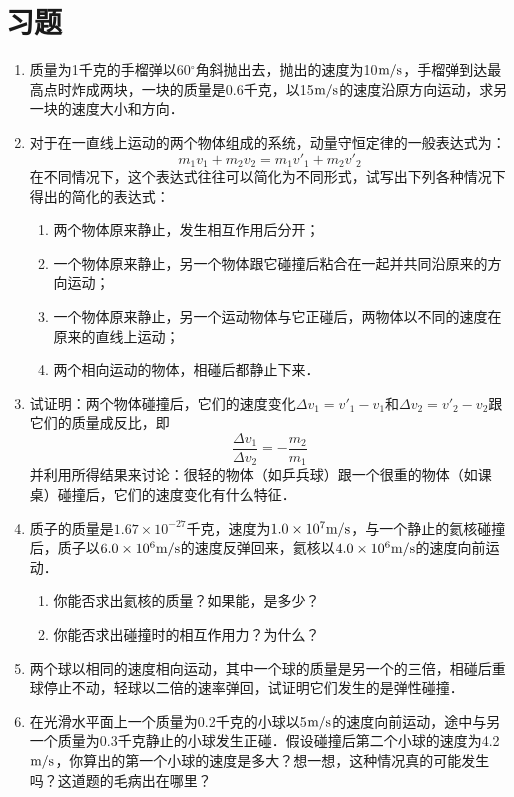 \section*{习题}
\begin{enumerate}
    \item 质量为1千克的手榴弹以60$^\circ$角斜抛出去，抛出的速度为10$\text{m}/\text{s}$，手榴弹到达最高点时炸成两块，一块的质量是0.6千克，以15$\text{m}/\text{s}$的速度沿原方向运动，求另一块的速度大小和方向．
    \item 对于在一直线上运动的两个物体组成的系统，动量守恒定律的一般表达式为：
\[m_1v_1+m_2v_2=m_1v'_1+m_2v'_2 \]
    在不同情况下，这个表达式往往可以简化为不同形式，试写出下列各种情况下得出的简化的表达式：
\begin{enumerate}
    \item 两个物体原来静止，发生相互作用后分开；
    \item 一个物体原来静止，另一个物体跟它碰撞后粘合在一起并共同沿原来的方向运动；
    \item 一个物体原来静止，另一个运动物体与它正碰后，两物体以不同的速度在原来的直线上运动；
    \item 两个相向运动的物体，相碰后都静止下来．
\end{enumerate}
\item 试证明：两个物体碰撞后，它们的速度变化$\Delta v_1=v'_1-v_1$和$\Delta v_2=v'_2-v_2$跟它们的质量成反比，即
\[\frac{\Delta v_1}{\Delta v_2}=-\frac{m_2}{m_1}\]
并利用所得结果来讨论：很轻的物体（如乒兵球）跟一个很重的物体（如课桌）碰撞后，它们的速度变化有什么特征．
\item 质子的质量是$1.67\times 10^{-27}$千克，速度为$1.0\times 10^7\text{m}/\text{s}$，与一个静止的氦核碰撞后，质子以$6.0\times 10^6\text{m}/\text{s}$的速度反弹回来，氦核以$4.0\times 10^6\text{m}/\text{s}$的速度向前运动．
   \begin{enumerate}
       \item 你能否求出氦核的质量？如果能，是多少？
       \item 你能否求出碰撞时的相互作用力？为什么？
   \end{enumerate}
   \item 两个球以相同的速度相向运动，其中一个球的质量是另一个的三倍，相碰后重球停止不动，轻球以二倍的速率弹回，试证明它们发生的是弹性碰撞．
   \item 在光滑水平面上一个质量为0.2千克的小球以5$\text{m}/\text{s}$的速度向前运动，途中与另一个质量为0.3千克静止的小球发生正碰．假设碰撞后第二个小球的速度为4.2$\text{m}/\text{s}$，你算出的第一个小球的速度是多大？想一想，这种情况真的可能发生吗？这道题的毛病出在哪里？
\begin{figure}[htp]\centering
{}
\end{figure}
\end{enumerate}
